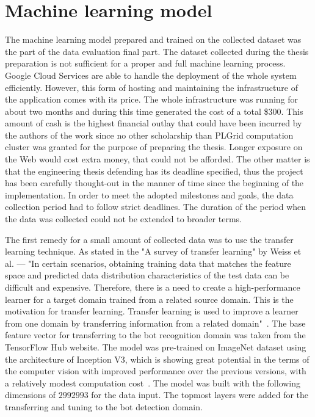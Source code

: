 \section{Machine learning model}\label{sec:machine-learning-model}
The machine learning model prepared and trained on the collected dataset was the part of the data evaluation final part.
The dataset collected during the thesis preparation is not sufficient for a proper and full machine learning process.
Google Cloud Services are able to handle the deployment of the whole system efficiently.
However, this form of hosting and maintaining the infrastructure of the application comes with its price.
The whole infrastructure was running for about two months and during this time generated the cost of a total \$300.
This amount of cash is the highest financial outlay that could have been incurred by the authors of the work since no other scholarship than PLGrid computation cluster was granted for the purpose of preparing the thesis.
Longer exposure on the Web would cost extra money, that could not be afforded.
The other matter is that the engineering thesis defending has its deadline specified, thus the project has been carefully thought-out in the manner of time since the beginning of the implementation.
In order to meet the adopted milestones and goals, the data collection period had to follow strict deadlines.
The duration of the period when the data was collected could not be extended to broader terms.

The first remedy for a small amount of collected data was to use the transfer learning technique.
As stated in the "A survey of transfer learning" by Weiss et al. --- "In certain scenarios, obtaining training data that matches the feature space and predicted data distribution characteristics of the test data can be difficult and expensive.
Therefore, there is a need to create a high-performance learner for a target domain trained from a related source domain.
This is the motivation for transfer learning.
Transfer learning is used to improve a learner from one domain by transferring information from a related domain"~\cite{transfer-learning-def}.
The base feature vector for transferring to the bot recognition domain was taken from the TensorFlow Hub website.
The model was pre-trained on ImageNet dataset using the architecture of Inception V3, which is showing great potential in the terms of the computer vision with improved performance over the previous versions, with a relatively modest computation cost~\cite{inception-v3}.
The model was built with the following dimensions of $299$\texttimes$299$\texttimes$3$ for the data input.
The topmost layers were added for the transferring and tuning to the bot detection domain.

